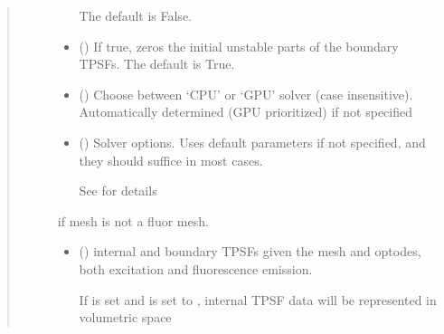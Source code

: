 \documentclass[letterpaper,10pt,english]{sphinxmanual}
\begin{document}
\begin{fulllineitems}
\begin{quote}
\begin{description}
\begin{itemize}
\sphinxAtStartPar
The default is False.


\item {} 
\sphinxAtStartPar
{} (\sphinxstyleliteralemphasis{\sphinxupquote{, }}) \textendash{} If true, zeros the initial unstable parts of the boundary TPSFs. The default is True.

\item {} 
\sphinxAtStartPar
{} (\sphinxstyleliteralemphasis{\sphinxupquote{, }}) \textendash{} Choose between ‘CPU’ or ‘GPU’ solver (case insensitive). Automatically determined (GPU prioritized) if not specified

\item {} 
\sphinxAtStartPar
{} ({\hyperref[\detokenize{_autosummary/nirfasterff.utils.SolverOptions:nirfasterff.utils.SolverOptions}]{}}\sphinxstyleliteralemphasis{\sphinxupquote{, }}) \textendash{} 
\sphinxAtStartPar
Solver options. Uses default parameters if not specified, and they should suffice in most cases.

\sphinxAtStartPar
See {\hyperref[\detokenize{_autosummary/nirfasterff.utils.SolverOptions:nirfasterff.utils.SolverOptions}]{}} for details


\end{itemize}

\sphinxAtStartPar
{} \textendash{} if mesh is not a fluor mesh.

\sphinxAtStartPar
\begin{itemize}
\item {} 
\sphinxAtStartPar
{} () \textendash{} internal and boundary TPSFs given the mesh and optodes, both excitation and fluorescence emission.

\sphinxAtStartPar
If  is set and  is set to , internal TPSF data will be represented in volumetric space


\end{itemize}
\end{description}
\end{quote}
\end{fulllineitems}
\end{document}
